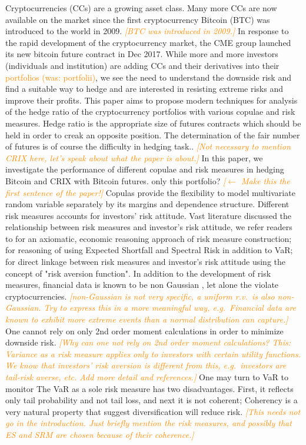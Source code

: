 \documentclass[11pt,a4paper,english]{article}
\providecommand{\natp}[1]{\textcolor{darkorange}{#1}}
\begin{document}
Cryptocurrencies (CCs) are a growing asset class.
Many more CCs are now available on the market since the first
cryptocurrency Bitcoin (BTC) was {\color{blue}introduced to the world in 2009}. \natp{\em [BTC was introduced in 2009.]}
In response to the rapid development of the cryptocurrency market, the CME group launched its new bitcoin future contract in Dec 2017.
While more and more investors (individuals and institution) are adding
CCs and their derivatives into their \natp{portfolios (was: portfolii)}, 
we see the need to understand the downside risk and find a suitable way to hedge and are interested in resisting extreme risks and improve their profits. {\color{blue}This paper aims to propose modern techniques for analysis of the hedge ratio of the cryptocurrency portfolios with various copulae and risk measures. Hedge ratio is the appropriate size of futures contracts which should be held in order to creak an opposite position. The determination of the fair number of futures is of course the difficulty in hedging task.}. \natp{\em [Not necessary to mention CRIX here, let's speak
  about what the paper is about.]}
In this paper, we investigate the performance of different copulae and
risk measures in hedging Bitcoin and CRIX with Bitcoin
futures. {\color{blue} only this portfolio?} \natp{\em [$\leftarrow$ Make this the first sentence of the paper!]}
Copulas provide the flexibility to model multivariate random variable
separately by its margins and dependence structure. 
Different risk measures accounts for investors' risk attitude.
Vast literature discussed the relationship between risk measures and investor's risk attitude, we refer readers to
\citet{artzner1999coherent} for an axiomatic, economic reasoning approach of risk measure construction;
\citet{embrechts2002correlation} for reasoning of using Expected Shortfall and Spectral Risk in addition to VaR;
\citet{Acerbi2002} for direct linkage between risk measures and investor's risk attitude using the concept of "risk aversion function".
In addition to the development of risk measures, financial data is known to be non Gaussian \natp{\cite{Cont2001}}, let
alone the violate cryptocurrencies. \natp{\em [non-Gaussian is not
  very specific, a uniform r.v.\ is also non-Gaussian. Try to express
  this in a more meaningful way, e.g.\ Financial data are known to
  exhibit more extreme events than a normal distribution can capture.]}
One cannot rely on only 2nd order moment calculations in order to
minimize downside risk. \natp{\em [Why can one not rely on 2nd order
  moment calculations? This: Variance as a risk measure applies only
  to investors with certain utility functions. We know that investors'
  risk aversion is different from this, e.g.\ investors are tail-risk
  averse, etc. Add more detail and references.]}
One may turn to VaR to monitor The VaR as a sole risk measure has two disadvantages.
First, it reflects only tail probability and not tail loss, and next it is not coherent;
Coherency is a very natural property that suggest diversification will
reduce risk. \natp{\em [This needs not go in the introduction. Just briefly mention the risk measures, and possibly that ES and SRM are chosen because of their coherence.]}
\medskip
\end{document}
